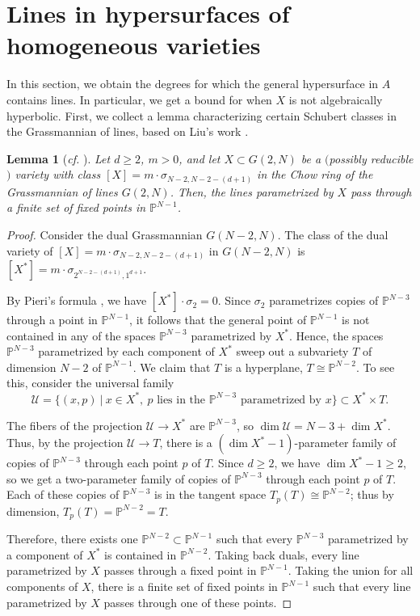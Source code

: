 \documentclass[11pt]{amsart}
\numberwithin{equation}{section}
\newtheorem{lemma}[theorem]{Lemma}
\theoremstyle{definition}
\theoremstyle{remark}
\renewcommand{\P}{\mathbb{P}}
\begin{document}
\section{Lines in hypersurfaces of homogeneous varieties}\label{sec4}

In this section, we obtain the degrees for which the general hypersurface in $A$ contains lines. In particular, we get a bound for when $X$ is not algebraically hyperbolic. First, we collect a lemma characterizing certain Schubert classes in the Grassmannian of lines, based on Liu's work \cite{Liu22}.

\begin{lemma}[\textit{cf.} {\cite[Proposition 3.1]{Liu22}}]\label{Schublemma}
    Let $d\ge 2$, $m>0$, and let $X\subset G(2,N)$ be a $($possibly reducible$)$ variety with class $[X] = m\cdot \sigma_{N-2, N-2-(d+1)}$ in the Chow ring of the Grassmannian of lines $G(2,N)$. Then, the lines parametrized by $X$ pass through a finite set of fixed points in $\P^{N-1}$.
\end{lemma}

\begin{proof}
  Consider the dual Grassmannian $G(N-2,N)$. The class of the dual variety of 
  $[X]=m\cdot \sigma_{N-2, N-2-(d+1)}$ in $G(N-2,N)$ is $[X^*]=m\cdot \sigma_{2^{N-2-(d+1)}, 1^{d+1}}$.

    By Pieri's formula \cite[Proposition 4.9]{3264}, we have $[X^*]\cdot \sigma_2 = 0$. Since $\sigma_2$ parametrizes copies of $\P^{N-3}$ through a point in $\P^{N-1}$, it follows that the general point of $\P^{N-1}$ is not contained in any of the spaces $\P^{N-3}$ parametrized by $X^*$. Hence, the spaces $\P^{N-3}$ parametrized by each component of $X^*$ sweep out a subvariety $T$ of dimension $N-2$ of $\P^{N-1}$. We claim that $T$ is a hyperplane, $T\cong \P^{N-2}$. To see this, consider the universal family
    \[ \mathcal{U} = \{ (x, p) \ | \ x\in X^*, \ p \text{ lies in the } \P^{N-3} \text{ parametrized by } x \}\subset X^*\times T. \]

    The fibers of the projection $\mathcal{U}\to X^*$ are $\P^{N-3}$, so $\dim \mathcal{U}=N-3+\dim X^*$. Thus, by the projection $\mathcal{U}\to T$, there is a $(\dim X^*-1)$-parameter family of copies of $\P^{N-3}$ through each point $p$ of $T$. Since $d\ge 2$, we have $\dim X^*-1\ge 2$, so we get a two-parameter family of copies of $\P^{N-3}$ through each point $p$ of $T$. Each of these copies of $\P^{N-3}$ is in the tangent space $T_p(T)\cong \P^{N-2}$; thus by dimension, $T_p(T)=\P^{N-2}=T$.

    Therefore, there exists one $\P^{N-2}\subset \P^{N-1}$ such that every $\P^{N-3}$ parametrized by a component of $X^*$ is contained in $\P^{N-2}$. Taking back duals, every line parametrized by $X$ passes through a fixed point in $\P^{N-1}$. Taking the union for all components of $X$, there is a finite set of fixed points in $\P^{N-1}$ such that every line parametrized by $X$ passes through one of these points.
\end{proof}
\end{document}
